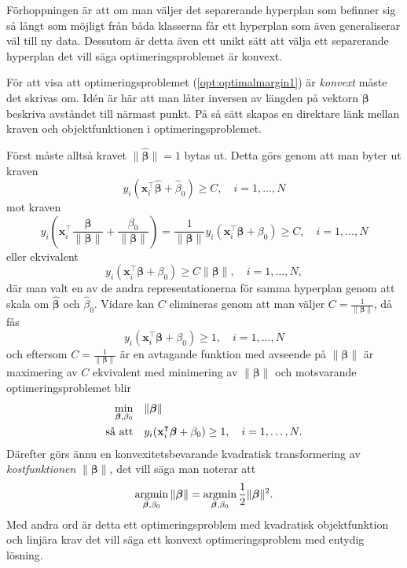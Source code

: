 \documentclass[a4paper, 12pt]{report}
\theoremstyle{definition}
\theoremstyle{remark}
\newcommand{\bfbeta}{{\boldsymbol{\beta}}}
\begin{document}
Förhoppningen är att om man väljer det separerande hyperplan som befinner sig så långt som möjligt från båda klasserna får ett hyperplan som även generaliserar väl till ny data. Dessutom är detta även ett unikt sätt att välja ett separerande hyperplan det vill säga optimeringsproblemet är konvext.

För att visa att optimeringsproblemet (\ref{opt:optimalmargin1}) är \textit{konvext} måste det skrivas om. Idén är här att man låter inversen av längden på vektorn $\bfbeta$ beskriva avståndet till närmast punkt. På så sätt skapas en direktare länk mellan kraven och objektfunktionen i optimeringsproblemet.

Först måste alltså kravet $\|\widehat{\bfbeta}\|=1$ bytas ut. Detta görs genom att man byter ut kraven
\begin{equation*}
y_i(\mathbf{x}_i^\intercal\widehat{\bfbeta}+\widehat{\beta}_0)\geq C,\quad i=1,\dots,N
\end{equation*}
mot kraven
\begin{equation*}
y_i\left(\mathbf{x}_i^\intercal\frac{\bfbeta}{\|\bfbeta\|}+\frac{\beta_0}{\|\bfbeta\|}\right) = 
\frac{1}{\|\bfbeta\|}y_i(\mathbf{x}_i^\intercal\bfbeta+\beta_0)
 \geq C,\quad i=1,\dots,N
\end{equation*}
eller ekvivalent
\begin{equation*}
y_i(\mathbf{x}_i^\intercal\bfbeta+\beta_0)\geq C\|\bfbeta\|,\quad i=1,\dots,N,
\end{equation*}
där man valt en av de andra representationerna för samma hyperplan genom att skala om $\widehat{\bfbeta}$ och $\widehat{\beta}_0$. Vidare kan $C$ elimineras genom att man väljer $C=\frac{1}{\|\bfbeta\|}$, då fås
\begin{equation*}
y_i(\mathbf{x}_i^\intercal\bfbeta+\beta_0)\geq 1,\quad i=1,\dots,N
\end{equation*}
och eftersom $C=\frac{1}{\|\bfbeta\|}$ är en avtagande funktion med avseende på $\|\bfbeta\|$ är maximering av $C$ ekvivalent med minimering av $\|\bfbeta\|$ och motsvarande optimeringsproblemet blir
\begin{equation*}%
\begin{aligned}
\operatornamewithlimits{min}_{\bfbeta,\beta_0} & & &\|\bfbeta\|\\
\text{så att} & & &y_i(\mathbf{x}_i^\intercal\bfbeta+\beta_0)\geq 1,\quad i=1,\dots,N.
\end{aligned}
\end{equation*}
Därefter görs ännu en konvexitetsbevarande kvadratisk transformering av \textit{kostfunktionen} $\|\bfbeta\|$, det vill säga man noterar att \begin{equation*}
\operatornamewithlimits{argmin}_{\bfbeta,\beta_0} \|\bfbeta\|=\operatornamewithlimits{argmin}_{\bfbeta,\beta_0} \frac{1}{2}\|\bfbeta\|^2.
\end{equation*}
Med andra ord är detta ett optimeringsproblem med kvadratisk objektfunktion och linjära krav det vill säga ett konvext optimeringsproblem med entydig lösning.
\end{document}

